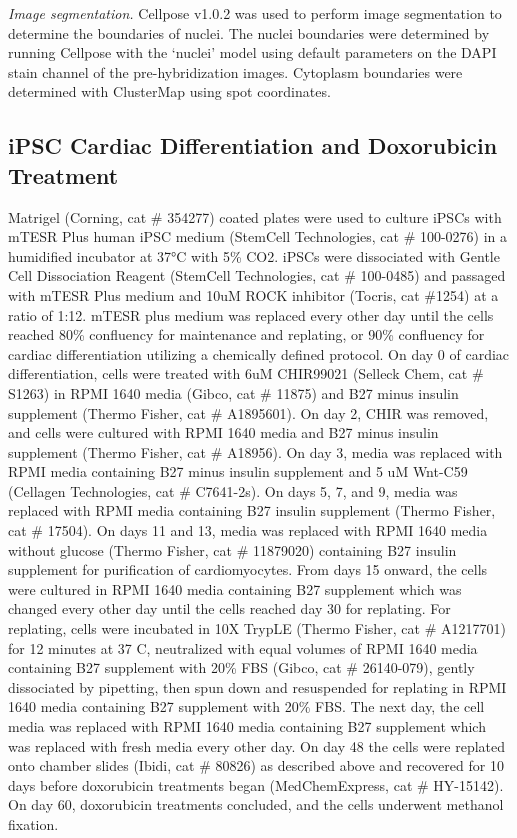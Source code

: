 \textit{Image segmentation.} Cellpose v1.0.2\cite{stringerCellposeGeneralistAlgorithm2021} was used to perform image segmentation to determine the boundaries of nuclei. The nuclei boundaries were determined by running Cellpose with the `nuclei' model using default parameters on the DAPI stain channel of the pre-hybridization images. Cytoplasm boundaries were determined with ClusterMap\cite{heClusterMapMultiscaleClustering2021} using spot coordinates.

\subsection{iPSC Cardiac Differentiation and Doxorubicin Treatment}
Matrigel (Corning, cat \# 354277) coated plates were used to culture iPSCs with mTESR Plus human iPSC medium (StemCell Technologies, cat \# 100-0276) in a humidified incubator at 37°C with 5\% CO2. iPSCs were dissociated with Gentle Cell Dissociation Reagent (StemCell Technologies, cat \# 100-0485) and passaged with mTESR Plus medium and 10uM ROCK inhibitor (Tocris, cat \#1254) at a ratio of 1:12. mTESR plus medium was replaced every other day until the cells reached 80\% confluency for maintenance and replating, or 90\% confluency for cardiac differentiation utilizing a chemically defined protocol\cite{lianRobustCardiomyocyteDifferentiation2012}. On day 0 of cardiac differentiation, cells were treated with 6uM CHIR99021 (Selleck Chem, cat \# S1263) in RPMI 1640 media (Gibco, cat \# 11875) and B27 minus insulin supplement (Thermo Fisher, cat \# A1895601). On day 2, CHIR was removed, and cells were cultured with RPMI 1640 media and B27 minus insulin supplement (Thermo Fisher, cat \# A18956). On day 3, media was replaced with RPMI media containing B27 minus insulin supplement and 5 uM Wnt-C59 (Cellagen Technologies, cat \# C7641-2s). On days 5, 7, and 9, media was replaced with RPMI media containing B27 insulin supplement (Thermo Fisher, cat \# 17504). On days 11 and 13, media was replaced with RPMI 1640 media without glucose (Thermo Fisher, cat \# 11879020) containing B27 insulin supplement for purification of cardiomyocytes. From days 15 onward, the cells were cultured in RPMI 1640 media containing B27 supplement which was changed every other day until the cells reached day 30 for replating. For replating, cells were incubated in 10X TrypLE (Thermo Fisher, cat \# A1217701) for 12 minutes at 37 C, neutralized with equal volumes of RPMI 1640 media containing B27 supplement with 20\% FBS (Gibco, cat \# 26140-079), gently dissociated by pipetting, then spun down and resuspended for replating in RPMI 1640 media containing B27 supplement with 20\% FBS. The next day, the cell media was replaced with RPMI 1640 media containing B27 supplement which was replaced with fresh media every other day. On day 48 the cells were replated onto chamber slides (Ibidi, cat \# 80826) as described above and recovered for 10 days before doxorubicin treatments began (MedChemExpress, cat \# HY-15142). On day 60, doxorubicin treatments concluded, and the cells underwent methanol fixation.

